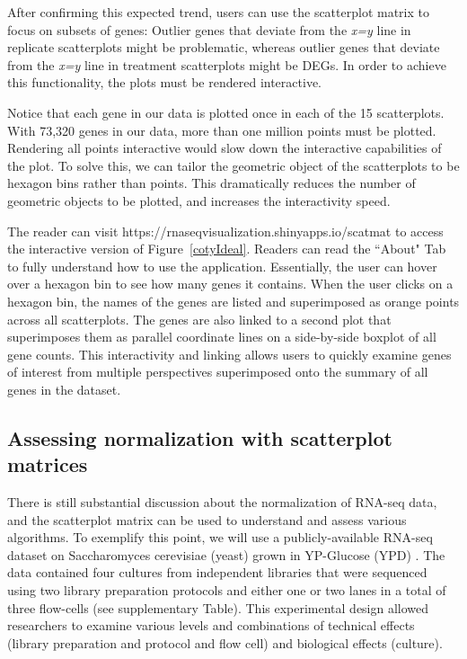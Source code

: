 \documentclass{bioinfo}
\begin{document}
After confirming this expected trend, users can use the scatterplot matrix to focus on subsets of genes: Outlier genes that deviate from the \textit{x=y} line in replicate scatterplots might be problematic, whereas outlier genes that deviate from the \textit{x=y} line in treatment scatterplots might be DEGs. In order to achieve this functionality, the plots must be rendered interactive.

Notice that each gene in our data is plotted once in each of the 15 scatterplots. With 73,320 genes in our data, more than one million points must be plotted. Rendering all points interactive would slow down the interactive capabilities of the plot. To solve this, we can tailor the geometric object of the scatterplots to be hexagon bins rather than points. This dramatically reduces the number of geometric objects to be plotted, and increases the interactivity speed.

The reader can visit https://rnaseqvisualization.shinyapps.io/scatmat to access the interactive version of Figure~\ref{cotyIdeal}. Readers can read the ``About" Tab to fully understand how to use the application. Essentially, the user can hover over a hexagon bin to see how many genes it contains. When the user clicks on a hexagon bin, the names of the genes are listed and superimposed as orange points across all scatterplots. The genes are also linked to a second plot that superimposes them as parallel coordinate lines on a side-by-side boxplot of all gene counts. This interactivity and linking allows users to quickly examine genes of interest from multiple perspectives superimposed onto the summary of all genes in the dataset. 

\subsection{Assessing normalization with scatterplot matrices}

There is still substantial discussion about the normalization of RNA-seq data, and the scatterplot matrix can be used to understand and assess various algorithms. To exemplify this point, we will use a publicly-available RNA-seq dataset on Saccharomyces cerevisiae (yeast) grown in YP-Glucose (YPD) \citep{Risso}. The data contained four cultures from independent libraries that were sequenced using two library preparation protocols and either one or two lanes in a total of three flow-cells (see supplementary Table). This experimental design allowed researchers to examine various levels and combinations of technical effects (library preparation and protocol and flow cell) and biological effects (culture).
\end{document}
